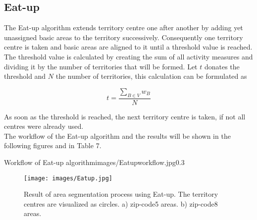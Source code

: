\subsection{Eat-up}

The Eat-up algorithm extends territory centre one after another by adding yet unassigned basic areas to the territory successively. Consequently one territory centre is taken and basic areas are aligned to it until a threshold value is reached. The threshold value is calculated by creating the sum of all activity measures and dividing it by the number of territories that will be formed. Let $t$ donates the threshold and $N$ the number of territories, this calculation can be formulated as

\[ \mathit{t  = \frac{\sum\nolimits  _{B \in V} w_{B}}{N}}\]

As soon as the threshold is reached, the next territory centre is taken, if not all centres were already used. \\
The workflow of the Eat-up algorithm and the results will be shown in the following figures and in Table 7.

\begin{figurevarSize}{Workflow of Eat-up algorithm}{images/Eatupworkflow.jpg}{0.3}\end{figurevarSize}

\begin{figure}[H]
	\centering
	\texttt{[image: images/Eatup.jpg]}
	\caption[Result of area segmentation process using Eat-up.]{Result of area segmentation process using Eat-up. The territory centres are visualized as circles. a) zip-code5 areas. b) zip-code8 areas.}
\end{figure}



